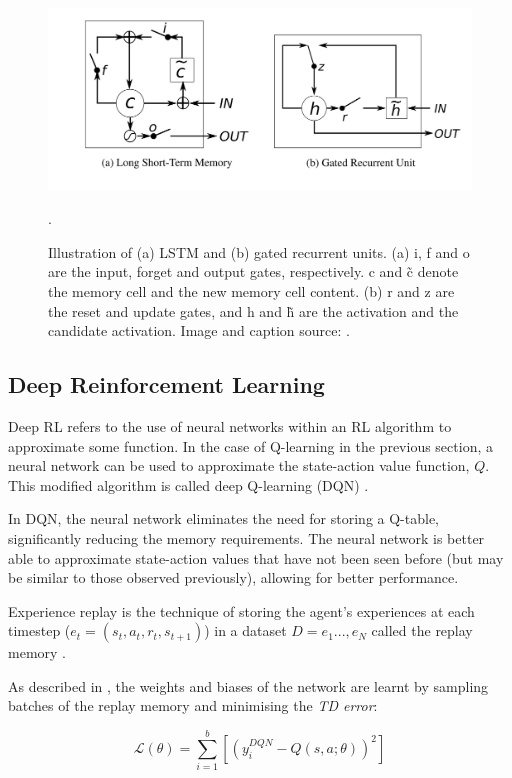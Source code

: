 \begin{figure}
    \centering
    \includegraphics[scale = 0.2]{images/rnn.png}
    \caption{Illustration of (a) LSTM and (b) gated recurrent units. (a) i, f and o are the input, forget and output gates, respectively. c and \~c denote the memory cell and the new memory cell content. (b) r and z are the reset and update gates, and h and \~h are the activation and the candidate activation. Image and caption source: \cite{rnn}.}.
    \label{fig:rnn}
\end{figure}

\subsection{Deep Reinforcement Learning}

Deep RL refers to the use of neural networks within an RL algorithm to approximate some function. In the case of Q-learning in the previous section, a neural network can be used to approximate the state-action value function, $Q$. This modified algorithm is called deep Q-learning (DQN) \cite{dqn}.

In DQN, the neural network eliminates the need for storing a Q-table, significantly reducing the memory requirements. The neural network is better able to approximate state-action values that have not been seen before (but may be similar to those observed previously), allowing for better performance.

Experience replay \cite{expeirnecereplay} is the technique of storing the agent's experiences at each timestep ($e_t = (s_t, a_t, r_t, s_{t+1})$) in a dataset $D = e_1..., e_N$ called the replay memory \cite{dqn}.

As described in \cite{qmixcite}, the weights and biases of the network are learnt by sampling batches of the replay memory and minimising the \textit{TD error}:

\[\mathscr{L}(\theta)=\sum_{i=1}^{b}[(y_i^{DQN}-Q(s,a;\theta))^2]\]

